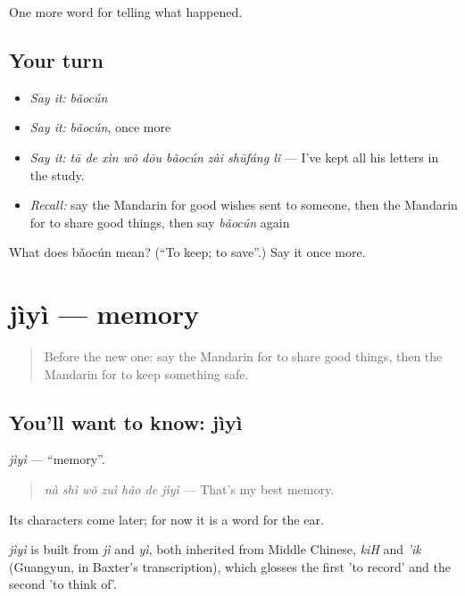 \begin{grammarlens}[title={What you've built}]
One more word for telling what happened.
\end{grammarlens}

\subsection*{Your turn}
\begin{itemize}
\raggedright
  \item \emph{Say it:} \emph{bǎocún}
  \item \emph{Say it:} \emph{bǎocún}, once more
  \item \emph{Say it:} \emph{tā de xìn wǒ dōu bǎocún zài shūfáng lǐ} — I've kept all his letters in the study.
  \item \emph{Recall:} say the Mandarin for good wishes sent to someone, then the Mandarin for to share good things, then say \emph{bǎocún} again
\end{itemize}

\begin{tcolorbox}[breakable,colback=teal!4,colframe=teal!35!black,title={Before you move on}]
What does bǎocún mean? (\textquotedblleft{}To keep; to save\textquotedblright{}.) Say it once more.
\end{tcolorbox}
\section[jìyì]{jìyì — memory}

\label{lesson:ZH-C344-jiyi}



\begin{quote}
Before the new one: say the Mandarin for to share good things, then the Mandarin for to keep something safe.
\end{quote}

\subsection*{You'll want to know: jìyì}
\emph{jìyì} — \textquotedblleft{}memory\textquotedblright{}.

\begin{quote}
\emph{nà shì wǒ zuì hǎo de jìyì} — That's my best memory.
\end{quote}

Its characters come later; for now it is a word for the ear.

\begin{cousinweb}
\emph{jìyì} is built from \emph{jì} and \emph{yì}, both inherited from Middle Chinese, \emph{kiH} and \emph{'ik} (Guangyun, in Baxter's transcription), which glosses the first 'to record' and the second 'to think of'.
\end{cousinweb}

